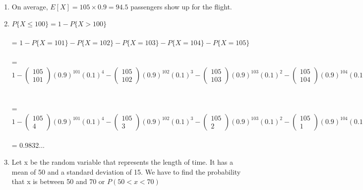 \documentclass{book}
\begin{document}
	\begin{enumerate}
		\item On average, $E[X] = 105 \times 0.9 = 94.5$ passengers show up for the flight.
		\item $P\{X \leq 100\} = 1 - P\{X > 100\}$\\\\
		= $1 - P\{X = 101\} - P\{X = 102\} - P\{X = 103\} - P\{X = 104\} - P\{X = 105\}$ \\ \\
		= $1 - \begin{pmatrix}105\\101\end{pmatrix}(0.9)^{101}(0.1)^4 - \begin{pmatrix}105\\102\end{pmatrix}(0.9)^{102}(0.1)^3 - \begin{pmatrix}105\\103\end{pmatrix}(0.9)^{103}(0.1)^2 - \begin{pmatrix}105\\104\end{pmatrix}(0.9)^{104}(0.1)^1 - \begin{pmatrix}105\\105\end{pmatrix}(0.9)^{105}(0.1)^0$ \\ \\ \\
		= $1 - \begin{pmatrix}105\\4\end{pmatrix}(0.9)^{101}(0.1)^4 - \begin{pmatrix}105\\3\end{pmatrix}(0.9)^{102}(0.1)^3 - \begin{pmatrix}105\\2\end{pmatrix}(0.9)^{103}(0.1)^2 - \begin{pmatrix}105\\1\end{pmatrix}(0.9)^{104}(0.1)^1 - \begin{pmatrix}105\\0\end{pmatrix}(0.9)^{105}(0.1)^0$ \\ \\
		= 0.9832...
		\item Let x be the random variable that represents the length of time. It has a mean of 50 and a standard deviation of 15. We have to find the probability that x is between 50 and 70 or $P( 50< x < 70)$\\\\

\end{enumerate}
\end{document}

